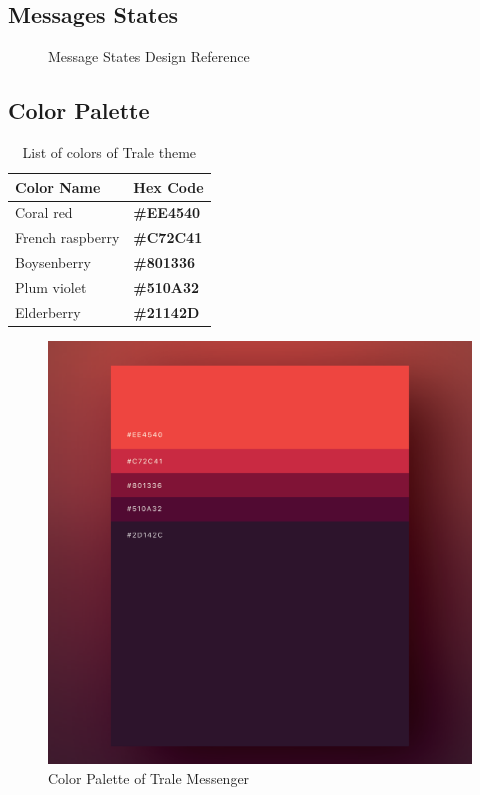 \subsection{Messages States}\label{subsec:messages-states}
\begin{figure}[ht]
    \caption{Message States Design Reference}
    \centering\def\svgwidth{15cm}\label{fig:figure3}
\end{figure}


\subsection{Color Palette}\label{subsec:color-palette}

\begin{table}[hb]
    \centering
    \begin{tabular}{|l|l|}
        \hline
        \textbf{Color Name} & \textbf{Hex Code}                     \\ \hline
        Coral red           & \color[HTML]{EE4540}\textbf{\#EE4540} \\ \hline
        French raspberry    & \color[HTML]{C72C41}\textbf{\#C72C41} \\ \hline
        Boysenberry         & \color[HTML]{801336}\textbf{\#801336} \\ \hline
        Plum violet         & \color[HTML]{510A32}\textbf{\#510A32} \\ \hline
        Elderberry          & \color[HTML]{21142D}\textbf{\#21142D} \\ \hline
    \end{tabular}
    \caption{List of colors of Trale theme}
    \label{tab:colorTable}
\end{table}

\begin{figure}
    \centering
    \includegraphics[width=1.0\textwidth]{./images/colorPalette.png}
    \caption{Color Palette of Trale Messenger}
    \label{fig:colorPalette}
\end{figure}


